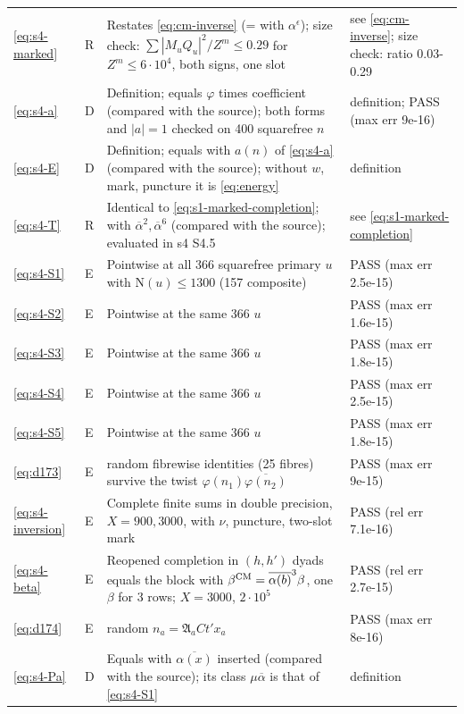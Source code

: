 \documentclass[11pt]{article}
\numberwithin{equation}{section}
\newcommand{\N}{\mathrm N}
\begin{document}
\begin{longtable}{@{}>{\raggedright\arraybackslash}p{1.2cm}>{\centering\arraybackslash}p{0.7cm}>{\raggedright\arraybackslash}p{9.05cm}>{\raggedright\arraybackslash}p{4.3cm}@{}}
\eqref{eq:s4-marked} & R & Restates \eqref{eq:cm-inverse} (= \cite[eq.~(17.1)]{OAI78} with $\alpha^\epsilon$); size check: $\sum|M_uQ_u|^2/Z^m\le0.29$ for $Z^m\le6\cdot10^4$, both signs, one slot & see \eqref{eq:cm-inverse}; size check: ratio 0.03-0.29\\
\eqref{eq:s4-a} & D & Definition; equals $\varphi$ times \cite{OAI78} coefficient (compared with the source); both forms and $|a|=1$ checked on 400 squarefree $n$ & definition; PASS (max err 9e-16)\\
\eqref{eq:s4-E} & D & Definition; equals \cite[eq.~(17.3)]{OAI78} with $a(n)$ of \eqref{eq:s4-a} (compared with the source); without $w$, mark, puncture it is \eqref{eq:energy} & definition\\
\eqref{eq:s4-T} & R & Identical to \eqref{eq:s1-marked-completion}; \cite[eq.~(14.2)]{OAI78} with $\overline\alpha^2,\overline\alpha^6$ (compared with the source); evaluated in s4 S4.5 & see \eqref{eq:s1-marked-completion}\\
\eqref{eq:s4-S1} & E & Pointwise at all 366 squarefree primary $u$ with $\N(u)\le1300$ (157 composite) & PASS (max err 2.5e-15)\\
\eqref{eq:s4-S2} & E & Pointwise at the same 366 $u$ & PASS (max err 1.6e-15)\\
\eqref{eq:s4-S3} & E & Pointwise at the same 366 $u$ & PASS (max err 1.8e-15)\\
\eqref{eq:s4-S4} & E & Pointwise at the same 366 $u$ & PASS (max err 2.5e-15)\\
\eqref{eq:s4-S5} & E & Pointwise at the same 366 $u$ & PASS (max err 1.8e-15)\\
\eqref{eq:d173} & E & 20 random fibrewise identities (25 fibres) survive the twist $\varphi(n_1)\overline{\varphi(n_2)}$ & PASS (max err 9e-15)\\
\eqref{eq:s4-inversion} & E & Complete finite sums in double precision, $X=900,3000$, with $\nu$, puncture, two-slot mark & PASS (rel err 7.1e-16)\\
\eqref{eq:s4-beta} & E & Reopened completion in $(h,h')$ dyads equals the block with $\beta^{\rm CM}=\overline{\alpha(b)}^3\beta$, one $\beta$ for 3 rows; $X=3000$, $2\cdot10^5$ & PASS (rel err 2.7e-15)\\
\eqref{eq:d174} & E & 3000 random $n_a=\mathfrak A_aCt'x_a$ & PASS (max err 8e-16)\\
\eqref{eq:s4-Pa} & D & Equals \cite[eq.~(17.30)]{OAI78} with $\overline{\alpha(x)}$ inserted (compared with the source); its class $\mu\overline\alpha$ is that of \eqref{eq:s4-S1} & definition\\

\end{longtable}
\end{document}
